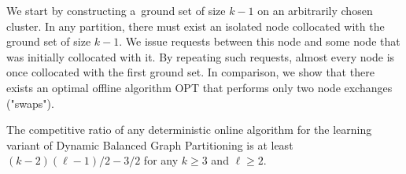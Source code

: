 \documentclass[a4paper,anonymous,USenglish]{lipics-v2019}
\newcommand{\OPT}{\textsc{OPT}\xspace}
\begin{document}
We start by constructing a~ground set of size $k-1$ on an arbitrarily chosen cluster.
In any partition, there must exist an isolated node collocated with the ground set of size $k-1$.
We issue requests between this node and some node that was initially collocated with it.
By repeating such requests, almost every node is once collocated with the first ground set.
In comparison, we show that there exists an optimal offline algorithm \OPT that performs only two node exchanges ("swaps").


\begin{theorem}
	\label{th:lowerbound}
	The competitive ratio of any deterministic online algorithm for the learning variant of Dynamic Balanced Graph Partitioning is at least
	 $(k-2)(\ell-1)/2 - 3/2$ for any $k\geq 3$ and $\ell \geq 2$.
\end{theorem}
\end{document}
